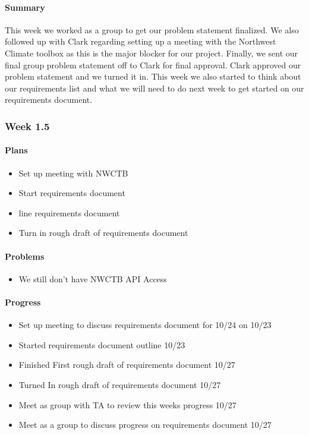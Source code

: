 \documentclass[onecolumn, draftclsnofoot,10pt, compsoc]{article}
\begin{document}
		        \paragraph{Summary}
		            This week we worked as a group to get our problem statement finalized. We also followed up with Clark regarding setting up a meeting with the Northwest Climate toolbox as this is the major blocker for our project. Finally, we sent our final group problem statement off to Clark for final approval. Clark approved our problem statement and we turned it in. This week we also started to think about our requirements list and what we will need to do next week to get started on our requirements document.\\
		    
		\subsubsection{Week 1.5}
			\paragraph{Plans} \hfill \break
		        
		        \begin{itemize}
		            \item Set up meeting with NWCTB
		            \item Start requirements document
		            \item line requirements document
		            \item Turn in rough draft of requirements document
		        \end{itemize}
		        
		    \paragraph{Problems} \hfill \break
		        \begin{itemize}
		            \item We still don't have NWCTB API Access
		        \end{itemize}
		
		    \paragraph{Progress} \hfill \break
		    
		    \begin{itemize}
		        \item Set up meeting to discuss requirements document for 10/24 on 10/23
		        \item Started requirements document outline 10/23
		        \item Finished First rough draft of requirements document 10/27
		        \item Turned In rough draft of requirements document 10/27
		        \item Meet as group with TA to review this weeks progress 10/27
		        \item Meet as a group to discuss progress on requirements document 10/27
		    \end{itemize}
		    
\end{document}

